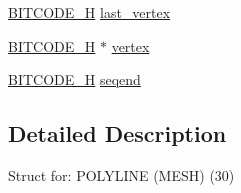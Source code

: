 \begin{DoxyCompactItemize}
\item 
\hyperlink{dwg_8h_a7c700e94e047a97ba8c24bdfe4029dc3}{\-B\-I\-T\-C\-O\-D\-E\-\_\-\-H} \hyperlink{struct__dwg__entity__POLYLINE__MESH_a16b7846784d8fba665f285cfcf07c4d9}{last\-\_\-vertex}
\item 
\hyperlink{dwg_8h_a7c700e94e047a97ba8c24bdfe4029dc3}{\-B\-I\-T\-C\-O\-D\-E\-\_\-\-H} $\ast$ \hyperlink{struct__dwg__entity__POLYLINE__MESH_a1ca3c7049c9c1c979a328632bae23024}{vertex}
\item 
\hyperlink{dwg_8h_a7c700e94e047a97ba8c24bdfe4029dc3}{\-B\-I\-T\-C\-O\-D\-E\-\_\-\-H} \hyperlink{struct__dwg__entity__POLYLINE__MESH_aee57eaf20323781218d1870a145d5255}{seqend}
\end{DoxyCompactItemize}


\subsection{\-Detailed \-Description}
\-Struct for\-: \-P\-O\-L\-Y\-L\-I\-N\-E (\-M\-E\-S\-H) (30) 

